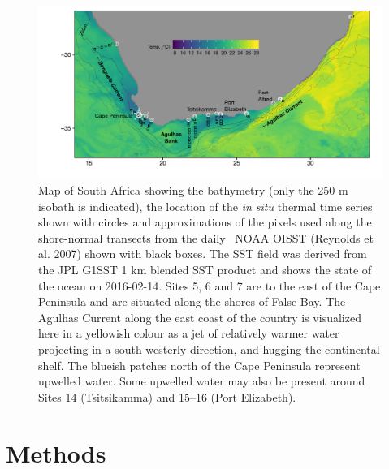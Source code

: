 \documentclass[a4paper,10pt,review]{elsarticle}
\begin{document}
\begin{figure}
\includegraphics[width=1.0\textwidth]{figure1_1km_labeled.pdf}
\caption{Map of South Africa showing the bathymetry (only the 250 m isobath is indicated), the location of the \emph{in situ} thermal time series shown with circles and approximations of the pixels used along the shore-normal transects from the daily \degree~NOAA OISST (Reynolds et al. 2007) shown with black boxes. The SST field was derived from the JPL G1SST 1 km blended SST product and shows the state of the ocean on 2016-02-14. Sites 5, 6 and 7 are to the east of the Cape Peninsula and are situated along the shores of False Bay. The Agulhas Current along the east coast of the country is visualized here in a yellowish colour as a jet of relatively warmer water projecting in a south-westerly direction, and hugging the continental shelf. The blueish patches north of the Cape Peninsula represent upwelled water. Some upwelled water may also be present around Sites 14 (Tsitsikamma) and 15--16 (Port Elizabeth).} \label{fig:Figure1}
\end{figure}

\section{Methods}
\end{document}
